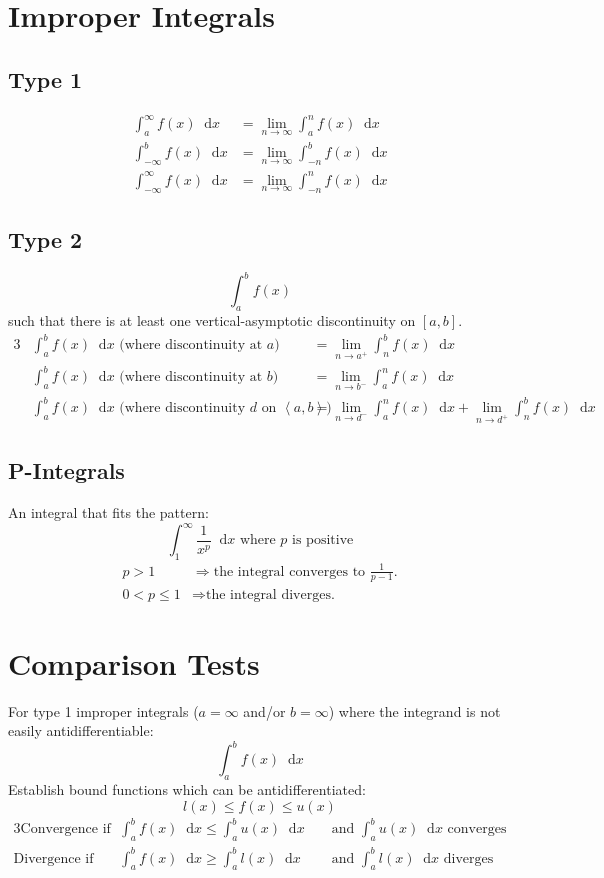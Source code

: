 \documentclass[12pt]{article}
\renewcommand*{\implies}{\Rightarrow}
\newcommand*{\rmaskip}{\setlength{\abovedisplayskip}{0pt}}
\newcommand*{\rmbskip}{\setlength{\belowdisplayskip}{0pt}}
\newcommand*{\rmskip}{\rmaskip \rmbskip}
\newcommand*{\D}[1]{\mathop{}\!\mathrm{d} #1}
\begin{document}
\section*{Improper Integrals}
\subsection*{Type 1}
{\rmskip\begin{align*}
  \int_a^\infty f(x) \D{x} &= \lim_{n \to \infty} \int_a^n f(x) \D{x}\\
  \int_{-\infty}^b f(x) \D{x} &= \lim_{n \to \infty} \int_{-n}^b f(x) \D{x}\\
  \int_{-\infty}^\infty f(x) \D{x} &= \lim_{n \to \infty} \int_{-n}^n f(x) \D{x}
\end{align*}}%
\subsection*{Type 2}
\[
  \int_a^b f(x)
\]
such that there is at least one vertical-asymptotic discontinuity on \([a,b]\).
\begin{alignat*}{3}
  &\int_a^b f(x) \D{x} \text{ (where discontinuity at \(a\)) }
    &&= \lim_{n \to a^+} \int_n^b f(x) \D{x}\\
  &\int_a^b f(x) \D{x} \text{ (where discontinuity at \(b\)) }
    &&= \lim_{n \to b^-} \int_a^n f(x) \D{x}\\
  &\int_a^b f(x) \D{x} \text{ (where discontinuity \(d\) on
    \(\left<a,b\right>\)) } &&= \lim_{n \to d^-} \int_a^n f(x) \D{x} +
    \lim_{n \to d^+} \int_n^b f(x) \D{x}
\end{alignat*}
\subsection*{P-Integrals}
An integral that fits the pattern:
\[
  \int_1^\infty \frac{1}{x^p} \D{x} \text{ where \(p\) is positive}
\]
{\rmaskip\begin{align*}
  p > 1 &\implies \text{the integral converges to \(\tfrac{1}{p-1}\).}\\
  0 < p \le 1 &\implies \text{the integral diverges.}
\end{align*}}%
\section*{Comparison Tests}
For type 1 improper integrals (\(a = \infty\) and\slash or \(b = \infty\))
where the integrand is not easily antidifferentiable:
\[
  \int_a^b f(x) \D{x}
\]
Establish bound functions which can be antidifferentiated:
\[
  l(x) \le f(x) \le u(x)
\]
{\rmskip\begin{alignat*}{3}
  \text{Convergence if } &\int_a^b f(x) \D{x} \le \int_a^b u(x) \D{x}
    &&\text{ and } \int_a^b u(x) \D{x} \text{ converges}\\
  \text{Divergence if } &\int_a^b f(x) \D{x} \ge \int_a^b l(x) \D{x}
    &&\text{ and } \int_a^b l(x) \D{x} \text{ diverges}
\end{alignat*}}%
\end{document}
